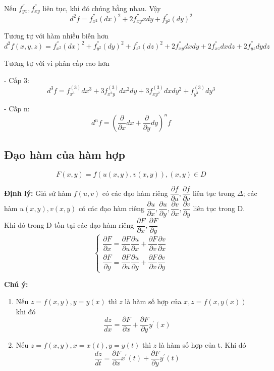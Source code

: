 \documentclass[12pt, a4paper]{article}
\begin{document}
	Nếu $ f^{''}_{yx}, f^{''}_{xy} $ liên tục, khi đó chúng bằng nhau. Vậy
	\[ d^2f=f^{''}_{x^2}(dx)^2 +2f^{''}_{xy}xdy + f^{''}_{y^2}(dy)^2  \]
	
	Tương tự với hàm nhiều biến hơn
	\[ d^2f(x,y,z)=f^{''}_{x^2}(dx)^2 + f^{''}_{y^2}(dy)^2 + f^{''}_{z^2}(dz)^2 +2f^{''}_{xy}dxdy + 2f^{''}_{xz}dxdz  +2f^{''}_{yz}dydz   \]
	
	Tương tự với vi phân cấp cao hơn
	
	- Cấp 3: \[ d^3f=f^{(3)}_{x^3}dx^3 + 3f^{(3)}_{x^2y}dx^2dy + 3f^{(3)}_{xy^2}dxdy^2 + f^{(3)}_{y^3}dy^3   \]
	
	- Cấp n: \[ d^nf=(\dfrac {\partial}{\partial x}dx + \dfrac {\partial}{\partial y}dy)^nf \]
	
	\subsection{Đạo hàm của hàm hợp}
	\[ F(x,y)=f(u(x,y),v(x,y)), (x,y) \in D \]
	
	\textbf {Định lý:} Giả sử hàm $ f(u,v) $ có các đạo hàm riêng $ \dfrac {\partial f}{\partial u}, \dfrac {\partial f}{\partial v} $ liên tục trong $ \Delta $; các hàm $ u(x,y), v(x,y) $ có các đạo hàm riêng $ \dfrac {\partial u}{\partial x}, \dfrac {\partial u}{\partial y}, \dfrac {\partial v}{\partial x}, \dfrac {\partial v}{\partial y} $ liên tục trong D. Khi đó trong D tồn tại các đạo hàm riêng $ \dfrac {\partial F}{\partial x}, \dfrac {\partial F}{\partial y} $
	\[ \begin{cases}
		\dfrac {\partial F}{\partial x}= \dfrac {\partial F}{\partial u}\dfrac {\partial u}{\partial x}+\dfrac {\partial F}{\partial v}\dfrac {\partial v}{\partial x} \\[12pt]
		\dfrac {\partial F}{\partial y}= \dfrac {\partial F}{\partial u}\dfrac {\partial u}{\partial y}+\dfrac {\partial F}{\partial v}\dfrac {\partial v}{\partial y}
		\end{cases} \]
	
	\textbf {Chú ý:}
	\begin{enumerate}[label=\roman*)]
		\item Nếu $ z=f(x,y), y=y(x) $ thì $ z $ là hàm số hợp của $ x, z=f(x,y(x)) $ khi đó \[ \dfrac{dz}{dx} =\dfrac{\partial F}{\partial x}+\dfrac{\partial F}{\partial y}y^{'}(x)  \]
		\item Nếu $ z=f(x,y), x=x(t), y=y(t) $ thì $ z $ là hàm số hợp của t. Khi đó \[ \dfrac{dz}{dt} =\dfrac{\partial F}{\partial x}x^{'}(t)+\dfrac{\partial F}{\partial y}y^{'}(t)  \]
	\end{enumerate}
\end{document}
